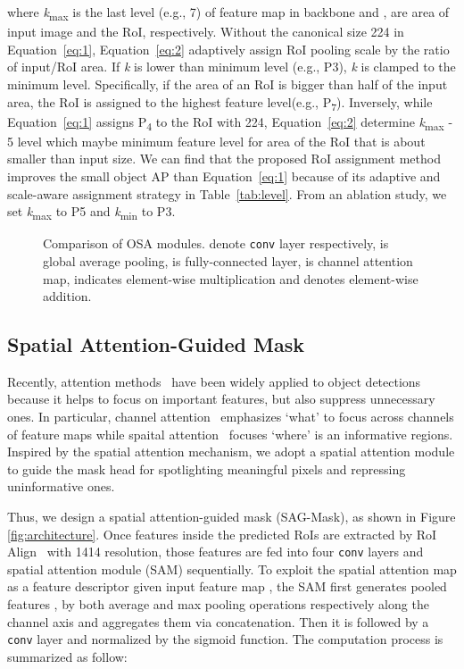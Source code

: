 \documentclass[10pt,twocolumn,letterpaper]{article}
\begin{document}
\noindent
where \textit{k}\textsubscript{max} is the last level (e.g., 7) of feature map in backbone and ,  are area of input image and the RoI, respectively. 
Without the canonical size 224 in Equation~\ref{eq:1}, Equation~\ref{eq:2} adaptively assign RoI pooling scale by the ratio of input/RoI area. 
If \textit{k} is lower than minimum level (e.g., P3), \textit{k} is clamped to the minimum level. 
Specifically,  if the area of an RoI is bigger than half of the input area, the RoI is assigned to the highest feature level(e.g., P\textsubscript{7}). 
Inversely, while Equation~\ref{eq:1} assigns P\textsubscript{4} to the RoI with 224, Equation~\ref{eq:2} determine \textit{k}\textsubscript{max} - 5 level which maybe minimum feature level for area of the RoI that is about  smaller than input size. 
We can find that the proposed RoI assignment method improves the small object AP than Equation~\ref{eq:1} because of its adaptive and scale-aware assignment strategy in Table~\ref{tab:level}.
From an ablation study, we set \textit{k}\textsubscript{max} to P5 and \textit{k}\textsubscript{min} to P3.

\begin{figure*}[t]
\centering
{}
\caption{Comparison of OSA modules.  denote  \texttt{conv} layer respectively,  is global average pooling,  is fully-connected layer,  is channel attention map,  indicates element-wise multiplication and  denotes element-wise addition.}
\label{fig:osa}
\vspace{-0.5cm}
\end{figure*}


\subsection{Spatial Attention-Guided Mask}
Recently, attention methods~\cite{hu2018squeeze,woo2018cbam,Zhu_2019_ICCV,Qin_2019_ICCV} have been widely applied to object detections because it helps to focus on important features, but also suppress unnecessary ones.
In particular, channel attention~\cite{hu2018squeeze,hu2018gather} emphasizes `what' to focus across channels of feature maps while spaital attention~\cite{woo2018cbam,chen2017sca} focuses `where' is an informative regions.
Inspired by the spatial attention mechanism, we adopt a spatial attention module to guide the mask head for spotlighting meaningful pixels and repressing uninformative ones.

Thus, we design a spatial attention-guided mask (SAG-Mask), as shown in Figure \ref{fig:architecture}.
Once features inside the predicted RoIs are extracted by RoI Align~\cite{he2017mask} with 1414 resolution, those features are fed into four \texttt{conv} layers and spatial attention module (SAM) sequentially.
To exploit the spatial attention map  as a feature descriptor given input feature map , the SAM first generates pooled features ,   by both average and max pooling operations respectively along the channel axis and aggregates them via concatenation.
Then it is followed by a  \texttt{conv} layer and normalized by the sigmoid function. The computation process is summarized as follow:
\end{document}
